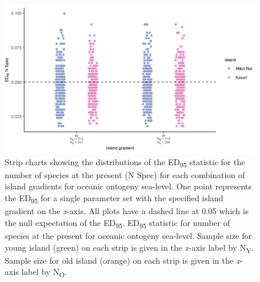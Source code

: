 \begin{figure}
    \centering
    \includegraphics{Island_gradient_ontogeny_sea_level_num_spec.png}
    \caption{Strip charts showing the distributions of the ED\textsubscript{95} statistic for the number of species at the present (N Spec) for each combination of island gradients for oceanic ontogeny sea-level. One point represents the ED\textsubscript{95} for a single parameter set with the specified island gradient on the \textit{x}-axis. All plots have a dashed line at 0.05 which is the null expectation of the ED\textsubscript{95}. ED\textsubscript{95} statistic for number of species at the present for oceanic ontogeny sea-level. Sample size for young island (green) on each strip is given in the \textit{x}-axis label by N\textsubscript{Y}. Sample size for old island (orange) on each strip is given in the \textit{x}-axis label by N\textsubscript{O}.}
    \label{fig:Island_gradient_ontogeny_sea_level_num_spec}
\end{figure}

